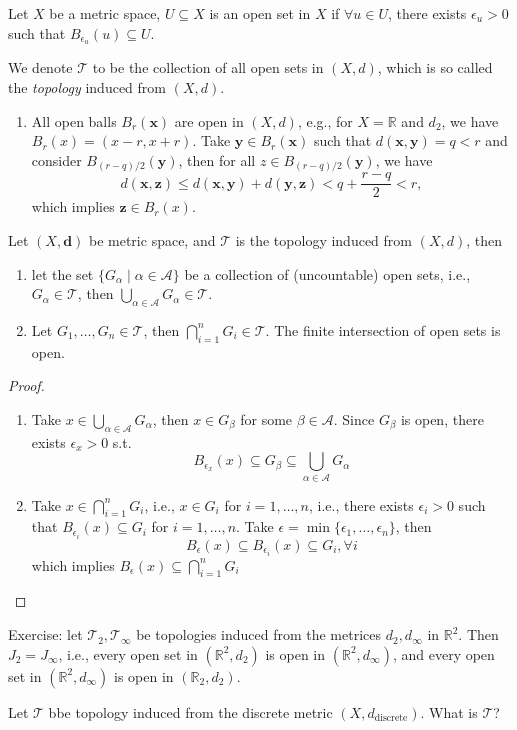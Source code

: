 \begin{definition}
Let $X$ be a metric space, $U\subseteq X$ is an open set in $X$ if $\forall u\in U$, there exists $\epsilon_u>0$ such that $B_{\epsilon_u}(u)\subseteq U$.
\end{definition}
We denote $\mathcal{T}$ to be the collection of all open sets in $(X,d)$, which is so called the \emph{topology} induced from $(X,d)$.
\begin{example}
\begin{enumerate}
\item
All open balls $B_r(\bm x)$ are open in $(X,d)$, e.g., for $X=\mathbb{R}$ and $d_2$, we have $B_r(x)=(x-r,x+r)$. Take $\bm y\in B_r(\bm x)$ such that $d(\bm x,\bm y)=q<r$ and consider $B_{(r-q)/2}(\bm y)$, then for all $z\in B_{(r-q)/2}(\bm y)$, we have
\[
d(\bm x,\bm z)\le d(\bm x,\bm y)+d(\bm y,\bm z)<q+\frac{r-q}{2}<r,
\]
which implies $\bm z\in B_r(x)$.
\end{enumerate}
\end{example}
\begin{proposition}
Let $(X,\bm d)$ be metric space, and $\mathcal{T}$ is the topology induced from $(X,d)$, then
\begin{enumerate}
\item
let the set $\{G_\alpha\mid\alpha\in\mathcal{A}\}$ be a collection of (uncountable) open sets, i.e., $G_\alpha\in\mathcal{T}$, then $\bigcup_{\alpha\in\mathcal{A}}G_\alpha\in\mathcal{T}$.
\item
Let $G_1,\dots,G_n\in\mathcal{T}$, then $\bigcap_{i=1}^nG_i\in\mathcal{T}$. The finite intersection of open sets is open.
\end{enumerate}
\end{proposition}
\begin{proof}
\begin{enumerate}
\item
Take $x\in\bigcup_{\alpha\in\mathcal{A}}G_\alpha$, 
then $x\in G_\beta$ for some $\beta\in\mathcal{A}$. 
Since $G_\beta$ is open, there exists $\epsilon_x>0$ s.t.
\[
B_{\epsilon_x}(x)\subseteq G_\beta\subseteq\bigcup_{\alpha\in\mathcal{A}}G_\alpha
\]
\item
Take $x\in\bigcap_{i=1}^nG_i$, i.e., $x\in G_i$ for $i=1,\dots,n$, i.e., there exists $\epsilon_i>0$ such that $B_{\epsilon_i}(x)\subseteq G_i$ for $i=1,\dots,n$. Take $\epsilon=\min\{\epsilon_1,\dots,\epsilon_n\}$, then
\[
B_\epsilon(x)\subseteq B_{\epsilon_i}(x)\subseteq G_i,\forall i
\]
which implies $B_\epsilon(x)\subseteq\bigcap_{i=1}^nG_i$



\end{enumerate}
\end{proof}
Exercise: let $\mathcal{T}_2,\mathcal{T}_\infty$ be topologies induced from the metrices $d_2,d_\infty$ in $\mathbb{R}^2$. Then $J_2=J_\infty$, i.e., every open set in $(\mathbb{R}^2,d_2)$ is open in $(\mathbb{R}^2,d_\infty)$, and every open set in $(\mathbb{R}^2,d_\infty)$ is open in $(\mathbb{R}_2,d_2)$.

Let $\mathcal{T}$ bbe topology induced from the discrete metric $(X,d_{\text{discrete}}).$ What is $\mathcal{T}$?












